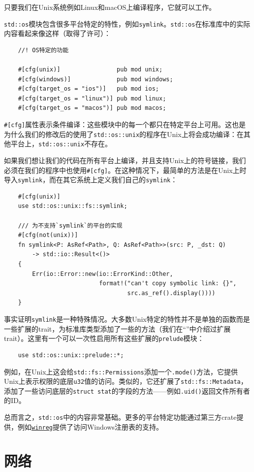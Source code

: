只要我们在Unix系统例如Linux和macOS上编译程序，它就可以工作。

\texttt{std::os}模块包含很多平台特定的特性，例如\texttt{symlink}。\texttt{std::os}在标准库中的实际内容看起来像这样（取得了许可）：
\begin{verbatim}
    //! OS特定的功能

    #[cfg(unix)]                pub mod unix;
    #[cfg(windows)]             pub mod windows;
    #[cfg(target_os = "ios")]   pub mod ios;
    #[cfg(target_os = "linux")] pub mod linux;
    #[cfg(target_os = "macos")] pub mod macos;
\end{verbatim}

\texttt{\#[cfg]}属性表示条件编译：这些模块中的每一个都只在特定平台上可用。这也是为什么我们的修改后的使用了\texttt{std::os::unix}的程序在Unix上将会成功编译：在其他平台上，\texttt{std::os::unix}不存在。

如果我们想让我们的代码在所有平台上编译，并且支持Unix上的符号链接，我们必须在我们的程序中也使用\texttt{\#[cfg]}。在这种情况下，最简单的方法是在Unix上时导入\texttt{symlink}，而在其它系统上定义我们自己的\texttt{symlink}：
\begin{verbatim}
    #[cfg(unix)]
    use std::os::unix::fs::symlink;

    /// 为不支持`symlink`的平台的实现
    #[cfg(not(unix))]
    fn symlink<P: AsRef<Path>, Q: AsRef<Path>>(src: P, _dst: Q)
        -> std::io::Result<()>
    {
        Err(io::Error::new(io::ErrorKind::Other,
                           format!("can't copy symbolic link: {}", 
                                   src.as_ref().display())))
    }
\end{verbatim}

事实证明\texttt{symlink}是一种特殊情况。大多数Unix特定的特性并不是单独的函数而是一些扩展的trait，为标准库类型添加了一些的方法（我们在“”中介绍过扩展trait）。这里有一个可以一次性启用所有这些扩展的\texttt{prelude}模块：
\begin{verbatim}
    use std::os::unix::prelude::*;
\end{verbatim}

例如，在Unix上这会给\texttt{std::fs::Permissions}添加一个\texttt{.mode()}方法，它提供Unix上表示权限的底层\texttt{u32}值的访问。类似的，它还扩展了\texttt{std::fs::Metadata}，添加了一些访问底层的\texttt{struct stat}的字段的方法——例如\texttt{.uid()}返回文件所有者的ID。

总而言之，\texttt{std::os}中的内容非常基础。更多的平台特定功能通过第三方crate提供，例如\href{https://crates.io/crates/winreg}{\texttt{winreg}}提供了访问Windows注册表的支持。

\section{网络}
